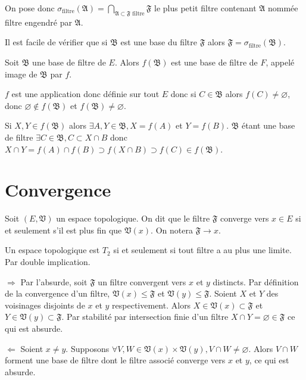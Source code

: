 \documentclass[a4paper, 11pt, french]{book}
\newenvironment{itemise}{\itemize}{\enditemize}
\theoremstyle{plain} %
\theoremstyle{definition} %
\theoremstyle{remark} %
\newcommand{\1}{\mathds{1}}
\newcommand\vide{\varnothing}
\newcommand{\infegal}{\leqslant}
\begin{document}
On pose donc $\sigma_\text{filtre}(\mathfrak{A})=\bigcap_{\mathfrak{A}\subset\mathfrak{F}\text{ filtre}}\mathfrak{F}$ le plus petit filtre contenant $\mathfrak{A}$ nommée filtre engendré par $\mathfrak{A}$.

\remarque
Il est facile de vérifier que si $\mathfrak{B}$ est une base du filtre $\mathfrak{F}$ alors $\mathfrak{F}=\sigma_\text{filtre}(\mathfrak{B})$.

\proposition
Soit $\mathfrak{B}$ une base de filtre de $E$.
Alors $f(\mathfrak{B})$ est une base de filtre de $F$, appelé image de $\mathfrak{B}$ par $f$.
\demonstration
\begin{itemise}
	\item $f$ est une application donc définie sur tout $E$ donc si $C\in\mathfrak{B}$ alors $f(C)\neq\vide$, donc $\vide\notin f(\mathfrak{B})$ et $f(\mathfrak{B})\neq\vide$.
	\item Si $X, Y\in f(\mathfrak{B})$ alors $\exists A, Y\in\mathfrak{B}, X=f(A)$ et $Y=f(B)$.
	$\mathfrak{B}$ étant une base de filtre $\exists C\in\mathfrak{B}, C\subset X\cap B$ donc $X\cap Y=f(A)\cap f(B)\supset f(X\cap B)\supset f(C)\in f(\mathfrak{B})$.
\end{itemise}

\section{Convergence}

Soit $(E, \mathfrak{V})$ un espace topologique.
On dit que le filtre $\mathfrak{F}$ converge vers $x\in E$ si et seulement s'il est plus fin que $\mathfrak{V}(x)$.
On notera $\mathfrak{F}\rightarrow x$.

\proposition
Un espace topologique est $T_2$ si et seulement si tout filtre a au plus une limite.
\demonstration Par double implication.
\begin{itemise}
	\item[$\Rightarrow$] Par l'absurde, soit $\mathfrak{F}$ un filtre convergent vers $x$ et $y$ distincts.
	Par définition de la convergence d'un filtre, $\mathfrak{V}(x)\infegal\mathfrak{F}$ et $\mathfrak{V}(y)\infegal\mathfrak{F}$.
	Soient $X$ et $Y$ des voisinages disjoints de $x$ et $y$ respectivement.
	Alors $X\in\mathfrak{V}(x)\subset\mathfrak{F}$ et $Y\in\mathfrak{V}(y)\subset\mathfrak{F}$.
	Par stabilité par intersection finie d'un filtre $X\cap Y=\vide\in\mathfrak{F}$ ce qui est absurde.
	\item[$\Leftarrow$] Soient $x\neq y$.
	Supposons $\forall V, W\in\mathfrak{V}(x)\times\mathfrak{V}(y), V\cap W\neq\vide$.
	Alors $V\cap W$ forment une base de filtre dont le filtre associé converge vers $x$ et $y$, ce qui est absurde.
\end{itemise}
\end{document}

